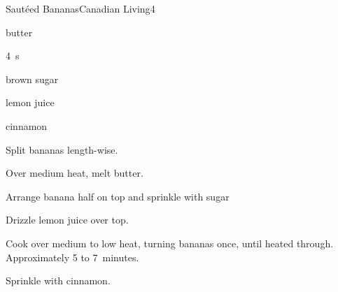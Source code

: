 \begin{recipe}{Sautéed Bananas}{Canadian Living}{4}

\begin{ingredients}
\item {} butter
\item 4~s
\item \C{\quarter} brown sugar
\item {} lemon juice
\item cinnamon
\end{ingredients}

\begin{directions}
\item Split bananas length-wise.
\item Over medium heat, melt butter.
\item Arrange banana half on top and sprinkle with sugar
\item Drizzle lemon juice over top.
\item Cook over medium to low heat, turning bananas once, until heated through. Approximately 5 to 7~minutes.
\item Sprinkle with cinnamon.
\end{directions}


\end{recipe}
